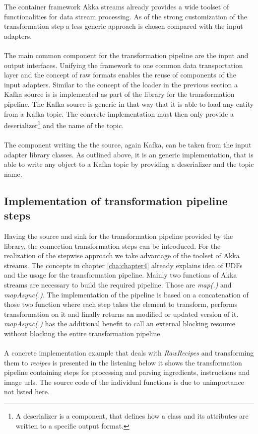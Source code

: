 The container framework Akka streams already provides a wide toolset of functionalities for data stream processing. As of the strong customization of the transformation step a less generic approach is chosen compared with the input adapters. 
\\\\
The main common component for the transformation pipeline are the input and output interfaces. Unifying the framework to one common data transportation layer and the concept of raw formats enables the reuse of components of the input adapters. Similar to the concept of the loader in the previous section a Kafka source is is implemented as part of the library for the transformation pipeline. The Kafka source is generic in that way that it is able to load any entity from a Kafka topic. The concrete implementation must then only provide a deserializer\footnote{A deserializer is a component, that defines how a class and its attributes are written to a specific output format.} and the name of the topic.
\\\\
The component writing the the source, again Kafka, can be taken from the input adapter library classes. As outlined above, it is an generic implementation, that is able to write any object to a Kafka topic by providing a deserializer and the topic name.

\subsection{Implementation of transformation pipeline steps}

Having the source and sink for the transformation pipeline provided by the library, the connection transformation steps can be introduced. For the realization of the stepwise approach we take advantage of the toolset of Akka streams. The concepts in chapter \ref{cha:chapter4} already explains idea of UDFs and the usage for the transformation pipeline. Mainly two functions of Akka streams are necessary to build the required pipeline. Those are \textit{map(.)} and \textit{mapAsync(.)}. The implementation of the pipeline is based on a concatenation of those two function where each step takes the element to transform, performs transformation on it and finally returns an modified or updated version of it. \textit{mapAsync(.)} has the additional benefit to call an external blocking resource without blocking the entire transformation pipeline. 
\\\\
A concrete implementation example that deals with \textit{RawRecipes} and transforming them to \textit{recipes} is presented in the listening below it shows the transformation pipeline containing steps for processing and parsing ingredients, instructions and image urls. The source code of the individual functions is due to unimportance not listed here.

